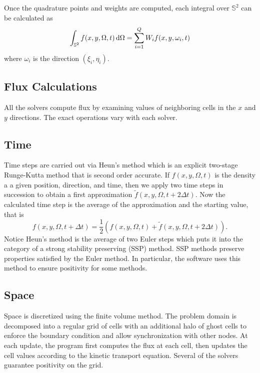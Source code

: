 \documentclass{article}
\newcommand{\twosphere}{\ensuremath{\mathbb{S}^2}\xspace}
\begin{document}
Once the quadrature points and weights are computed, each integral over \twosphere
can be calculated as
\begin{equation}
    \int_{\twosphere} f(x,y,\Omega,t) \dif \Omega = \sum _{i=1}^Q W_i f(x,y,\omega_i,t)
\end{equation}
where $\omega_i$ is the direction $(\xi_i,\eta_i)$.

\subsection{Flux Calculations}
All the solvers compute flux by examining values of neighboring cells in the
$x$ and $y$ directions.  The exact operations vary with each solver.

\subsection{Time}
Time steps are carried out via Heun's method which is an explicit two-stage Runge-Kutta method that is second order accurate. 
If $f(x,y,\Omega,t)$ is the density a a given position, direction, and time,
then we apply two time steps in succession to obtain a first approximation
$\tilde{f}(x,y,\Omega,t+2\Delta t)$. Now the calculated time step is
the average of the approximation and the starting value, that is
\begin{equation}
f(x,y,\Omega,t+\Delta t) = \frac{1}{2}\left(
        f(x,y,\Omega,t) + \tilde{f}(x,y,\Omega,t+2\Delta t)
    \right).
\end{equation}
Notice Heun's method is the average of two Euler steps which puts it into the category of a strong stability preserving (SSP) method.
SSP methods preserve properties satisfied by the Euler method.
In particular, the software uses this method to ensure positivity for some methods.

\subsection{Space}
Space is discretized using the finite volume method. The problem domain is
decomposed into a regular grid of cells with an additional halo of ghost cells
to enforce the boundary condition and allow synchronization with other nodes.
At each update, the program first computes the flux at each cell, then updates
the cell values according to the kinetic transport equation. Several of the
solvers guarantee positivity on the grid.
\end{document}
